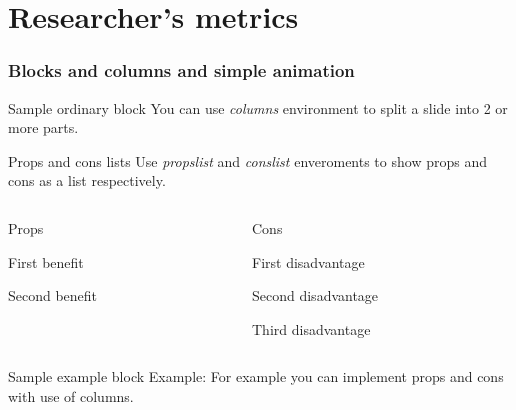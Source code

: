 \documentclass{beamer}
\begin{document}
\section{Researcher's metrics}

\begin{frame}
    \frametitle{Blocks and columns and simple animation}

    \begin{block}{Sample ordinary block}
        You can use \textit{columns} environment to
        split a slide into 2 or more parts.
    \end{block}

    \begin{alertblock}{Props and cons lists}
        Use \textit{propslist} and \textit{conslist} enveroments
        to show props and cons as a list respectively.
    \end{alertblock}

    \begin{columns}[T]
        \begin{column}{.5\textwidth} \pause
            \centering Props
            \begin{propslist}
                \item First benefit \pause
                \item Second benefit \pause
            \end{propslist}
        \end{column}
        \begin{column}{.5\textwidth}
            \centering Cons %
            \begin{conslist}
                \item First disadvantage \pause
                \item Second disadvantage \pause
                \item Third disadvantage \pause
            \end{conslist}
        \end{column}
    \end{columns}

    \begin{exampleblock}{Sample example block}
        Example: For example you can implement props and cons
        with use of columns.
    \end{exampleblock}

\end{frame}
\end{document}
